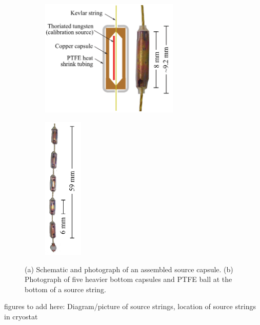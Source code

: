 \begin{figure}[htpb]
\begin{center}
\begin{subfigure}[b]{0.60\textwidth}
\includegraphics[height=2.2in]{Figures/source_capsule_schematic.pdf}
\caption{}
\label{fig:source_carrierA}
\end{subfigure}
\begin{subfigure}[b]{0.15\textwidth}
\includegraphics[height=2.7in]{Figures/string_bottom.pdf}
\caption{}
\label{fig:source_carrierB}
\end{subfigure}
\end{center}
\caption[(a) Schematic and photograph of an assembled source capsule. (b) Photograph of five heavier bottom capsules and PTFE ball at the bottom of a source string.]{(a) Schematic and photograph of an assembled source capsule. (b) Photograph of five heavier bottom capsules and PTFE ball at the bottom of a source string.}
\label{fig:source_carrier}
\end{figure}
 

figures to add here: Diagram/picture of source strings, location of source strings in cryostat
